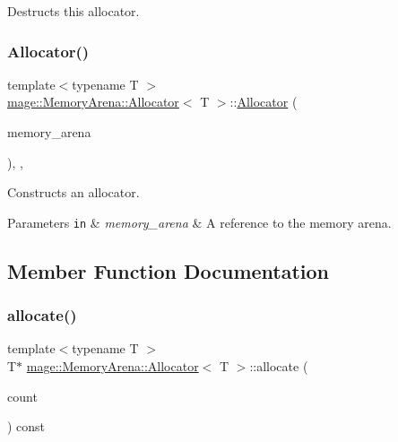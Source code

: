 Destructs this allocator. \mbox{\label{classmage_1_1_memory_arena_1_1_allocator_a2b2b5fbc4b5552c88ee35e3c093a9468}} 
\subsubsection{\texorpdfstring{Allocator()}{Allocator()}\hspace{0.1cm}{\footnotesize\ttfamily [4/4]}}
{\footnotesize\ttfamily template$<$typename T $>$ \\
\mbox{\hyperlink{classmage_1_1_memory_arena_1_1_allocator}{mage\+::\+Memory\+Arena\+::\+Allocator}}$<$ T $>$\+::\mbox{\hyperlink{classmage_1_1_memory_arena_1_1_allocator}{Allocator}} (\begin{DoxyParamCaption}\item[{\mbox{\hyperlink{namespacemage_a8769f9d670d6b585ea306cb1062af94b}{Not\+Null}}$<$ \mbox{\hyperlink{classmage_1_1_memory_arena}{Memory\+Arena}} $\ast$ $>$}]{memory\+\_\+arena }\end{DoxyParamCaption})\hspace{0.3cm}{\ttfamily [explicit]}, {\ttfamily [private]}, {\ttfamily [noexcept]}}

Constructs an allocator.


\begin{DoxyParams}[1]{Parameters}
\mbox{\tt in}  & {\em memory\+\_\+arena} & A reference to the memory arena. \\
\hline
\end{DoxyParams}


\subsection{Member Function Documentation}
\mbox{\label{classmage_1_1_memory_arena_1_1_allocator_a6ccab19e9d75a98aafe5bc91f6aefd5f}} 
\subsubsection{\texorpdfstring{allocate()}{allocate()}\hspace{0.1cm}{\footnotesize\ttfamily [1/2]}}
{\footnotesize\ttfamily template$<$typename T $>$ \\
T$\ast$ \mbox{\hyperlink{classmage_1_1_memory_arena_1_1_allocator}{mage\+::\+Memory\+Arena\+::\+Allocator}}$<$ T $>$\+::allocate (\begin{DoxyParamCaption}\item[{size\+\_\+t}]{count }\end{DoxyParamCaption}) const}

